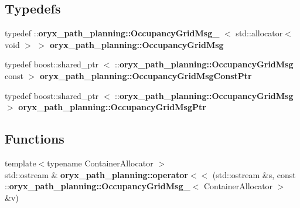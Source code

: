 \subsection*{\-Typedefs}
\begin{DoxyCompactItemize}
\item 
typedef \*
\-::{\bf oryx\-\_\-path\-\_\-planning\-::\-Occupancy\-Grid\-Msg\-\_\-}\*
$<$ std\-::allocator$<$ void $>$ $>$ {\bf oryx\-\_\-path\-\_\-planning\-::\-Occupancy\-Grid\-Msg}
\item 
typedef boost\-::shared\-\_\-ptr\*
$<$ \-::{\bf oryx\-\_\-path\-\_\-planning\-::\-Occupancy\-Grid\-Msg} \*
const  $>$ {\bf oryx\-\_\-path\-\_\-planning\-::\-Occupancy\-Grid\-Msg\-Const\-Ptr}
\item 
typedef boost\-::shared\-\_\-ptr\*
$<$ \-::{\bf oryx\-\_\-path\-\_\-planning\-::\-Occupancy\-Grid\-Msg} $>$ {\bf oryx\-\_\-path\-\_\-planning\-::\-Occupancy\-Grid\-Msg\-Ptr}
\end{DoxyCompactItemize}
\subsection*{\-Functions}
\begin{DoxyCompactItemize}
\item 
{\footnotesize template$<$typename Container\-Allocator $>$ }\\std\-::ostream \& {\bf oryx\-\_\-path\-\_\-planning\-::operator$<$$<$} (std\-::ostream \&s, const \-::{\bf oryx\-\_\-path\-\_\-planning\-::\-Occupancy\-Grid\-Msg\-\_\-}$<$ \-Container\-Allocator $>$ \&v)
\end{DoxyCompactItemize}
